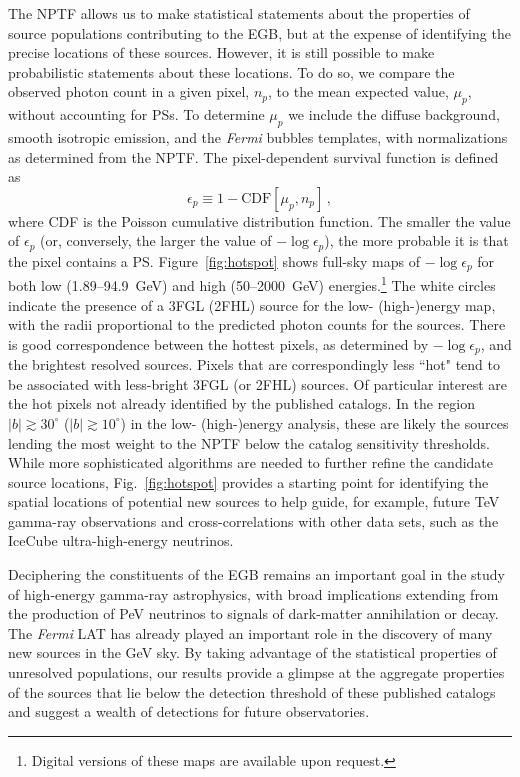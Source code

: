 The NPTF allows us to make statistical statements about the properties of source populations contributing to the EGB, but at the expense of identifying the precise locations of these sources.  However, it is still possible to make probabilistic statements about these locations.  To do so, we compare the observed photon count in a given pixel, $n_p$, to the mean expected value, $\mu_p$, without accounting for PSs.  To determine $\mu_p$ we include the diffuse background, smooth isotropic emission, and the {\it Fermi} bubbles templates, with normalizations as determined from the NPTF.
The pixel-dependent survival function is defined as
\begin{equation}
\epsilon_p \equiv 1- \text{CDF}\left[ \mu_p, n_p \right] \, ,
\end{equation}
where CDF is the Poisson cumulative distribution function.  The smaller the value of $\epsilon_p$ (or, conversely, the larger the value of $-\log \epsilon_p$), the more probable it is that the pixel contains a PS.  Figure~\ref{fig:hotspot} shows full-sky maps of $-\log \epsilon_p$ for both low (1.89--94.9~GeV) and high (50--2000~GeV) energies.\footnote{ Digital versions of these maps are available upon request.}  The white circles indicate the presence of a 3FGL (2FHL) source for the low- \mbox{(high-)}energy map, with the radii proportional to the predicted photon counts for the sources.  There is good correspondence between the hottest pixels, as determined by $-\log \epsilon_p$,  and the brightest resolved sources.  Pixels that are correspondingly less ``hot" tend to be associated with less-bright 3FGL (or 2FHL) sources.  Of particular interest are the hot pixels not already identified by the published catalogs.  In the region $|b| \gtrsim 30^\circ$ ($|b| \gtrsim 10^\circ$) in the low- (high-)energy analysis, these are likely the sources lending the most weight to the NPTF below the catalog sensitivity thresholds.  While more sophisticated algorithms are needed to further refine the candidate source locations, Fig.~\ref{fig:hotspot} provides a starting point for identifying the spatial locations of potential new sources to help guide, for example, future TeV gamma-ray observations and cross-correlations with other data sets, such as the IceCube ultra-high-energy neutrinos.

Deciphering the constituents of the EGB remains an important goal in the study of high-energy gamma-ray astrophysics, with broad implications extending from the production of PeV neutrinos to signals of dark-matter annihilation or decay.     The \emph{Fermi} LAT has already played an important role in the discovery of many new sources in the GeV sky.  By taking advantage of the statistical properties of unresolved populations, our results provide a glimpse at the aggregate properties of the sources that lie below the detection threshold of these published catalogs and suggest a wealth of detections for future observatories.

